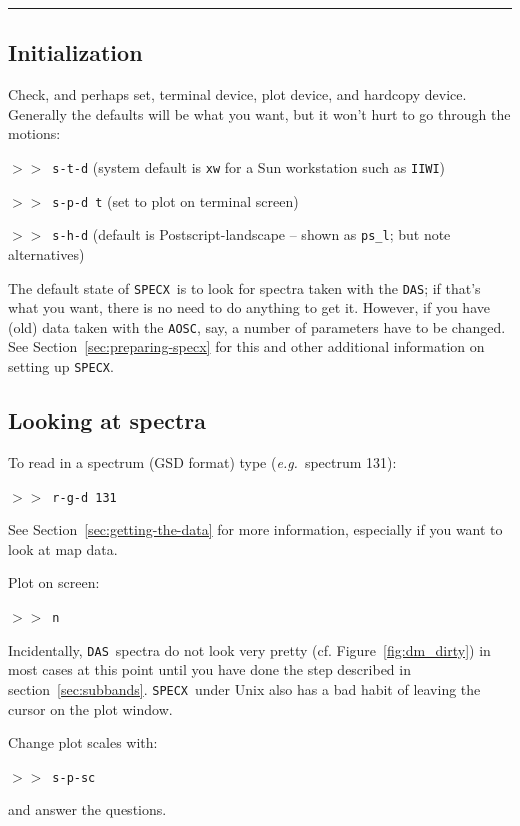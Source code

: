 \documentclass[11pt,twoside]{article}
\newcommand{\eg}{{\it e.g.}}
\newcommand{\SPECX}{{\tt SPECX}}
\newcommand{\das}{{\tt DAS}}
\newcommand{\aosc}{{\tt AOSC}}
\newcommand{\margnote}[1]
{\marginpar{({\it{\ref{#1}}})}}
\newcommand{\SP}{{$>\!>$}}
\newcommand{\myline}
{\vspace*{-0.2in}\begin{center}\rule{3.0in}{0.015in}\end{center}}
\begin{document}
\myline

\subsection{Initialization}
\label{sec:specx-init}
\margnote{sec:preparing-specx}
Check, and perhaps set, terminal device,
plot device, and hardcopy device. Generally the defaults will be what
you want, but it won't hurt to go through the motions:

\SP\ {\tt{s-t-d}} \hspace*{0.5in}(system default is {\tt{xw}} for a
Sun workstation such as {\tt{IIWI}})

\SP\ {\tt{s-p-d t}} \hspace*{0.35in}(set to plot on terminal screen)

\SP\ {\tt{s-h-d}} \hspace*{0.5in}(default is Postscript-landscape --
shown as {\verb|ps_l|}; but note alternatives)

The default state of \SPECX\ is to look for spectra taken with the
\das ; if that's what you want, there is no need to do anything to get
it. However, if you have (old) data taken with the \aosc , say, a
number of parameters have to be changed. See
Section~\ref{sec:preparing-specx} for this and other additional
information on setting up \SPECX .

\normalmarginpar
\subsection{Looking at spectra}
To read in a spectrum (GSD format)\margnote{sec:getting-the-data} type
(\eg\ spectrum 131):

\SP\ {\tt{r-g-d 131}}

See Section~\ref{sec:getting-the-data} for more information,
especially if you want to look at map data.

Plot on screen:

\SP\ {\tt{n}}

Incidentally, \das\ spectra do not look very pretty (cf.
Figure~\ref{fig:dm_dirty}) in most cases at this point until you have
done the step described in section~\ref{sec:subbands}. \SPECX\ under
Unix also has a bad habit of leaving the cursor on the plot window.

Change plot scales\margnote{sec:specx_5.1} with:

\SP\ {\tt{s-p-sc}}

and answer the questions.
\end{document}
